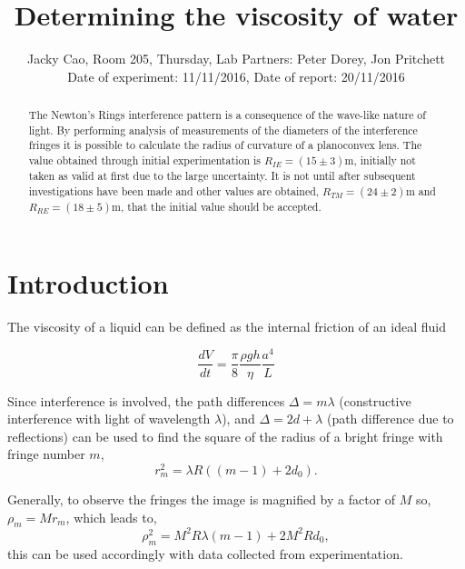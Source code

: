 \documentclass[twocolumn]{revtex4}
\begin{document}
\textheight=26.385cm

\title{Determining the viscosity of water} 
 
 
\author{Jacky Cao, Room 205, Thursday, Lab Partners: Peter Dorey, Jon Pritchett \\ Date of experiment: 11/11/2016, Date of report: 20/11/2016}


\begin{abstract}              
 
The Newton's Rings interference pattern is a consequence of the wave-like nature of light. By performing analysis of measurements of the diameters of the interference fringes it is possible to calculate the radius of curvature of a planoconvex lens. The value obtained through initial experimentation is $R_{IE}=(15\pm3)$m, initially not taken as valid at first due to the large uncertainty. It is not until after subsequent investigations have been made and other values are obtained, $R_{TM}=(24\pm2)$m and $R_{RE}=(18\pm5)$m, that the initial value should be accepted. 

\end{abstract}

\maketitle

\section{Introduction} 
\vspace{-2ex} 

The viscosity of a liquid can be defined as the internal friction of an ideal fluid

\begin{equation} \tag{1}
\frac{dV}{dt}=\frac{\pi}{8}\frac{\rho gh}{\eta}\frac{a^4}{L}
\end{equation}

Since interference is involved, the path differences $\Delta=m\lambda$ (constructive interference with light of wavelength $\lambda$), and $\Delta=2d+\lambda$ (path difference due to reflections) can be used to find the square of the radius of a bright fringe with fringe number $m$,
\begin{equation} \tag{2}
r_m^2=\lambda{R((m-1)+2d_0)}.
\end{equation}

Generally, to observe the fringes the image is magnified by a factor of $M$ so, $\rho_m=Mr_m$, which leads to, 
\begin{equation} \tag{3}
\rho_m^2=M^2R\lambda{(m-1)}+2M^2Rd_0,
\end{equation}
this can be used accordingly with data collected from experimentation.
\\
\end{document}

